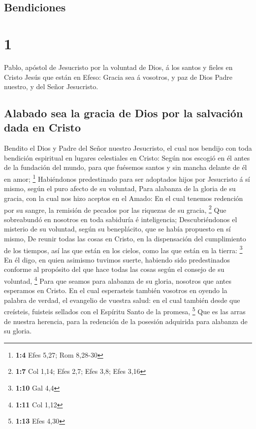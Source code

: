 \hypertarget{bendiciones}{%
\subsection{Bendiciones}\label{bendiciones}}

\hypertarget{section}{%
\section{1}\label{section}}

 Pablo, apóstol de Jesucristo por la voluntad de Dios, á
los santos y fieles en Cristo Jesús que están en Efeso: 
Gracia sea á vosotros, y paz de Dios Padre nuestro, y del Señor
Jesucristo.

\hypertarget{alabado-sea-la-gracia-de-dios-por-la-salvaciuxf3n-dada-en-cristo}{%
\subsection{Alabado sea la gracia de Dios por la salvación dada en
Cristo}\label{alabado-sea-la-gracia-de-dios-por-la-salvaciuxf3n-dada-en-cristo}}

 Bendito el Dios y Padre del Señor nuestro Jesucristo, el
cual nos bendijo con toda bendición espiritual en lugares celestiales en
Cristo:  Según nos escogió en él antes de la fundación del
mundo, para que fuésemos santos y sin mancha delante de él en amor;
\footnote{\textbf{1:4} Efes 5,27; Rom 8,28-30} 
Habiéndonos predestinado para ser adoptados hijos por Jesucristo á sí
mismo, según el puro afecto de su voluntad,  Para alabanza
de la gloria de su gracia, con la cual nos hizo aceptos en el Amado:
 En el cual tenemos redención por su sangre, la remisión
de pecados por las riquezas de su gracia, \footnote{\textbf{1:7} Col
  1,14; Efes 2,7; Efes 3,8; Efes 3,16}  Que sobreabundó en
nosotros en toda sabiduría é inteligencia; 
Descubriéndonos el misterio de su voluntad, según su beneplácito, que se
había propuesto en sí mismo,  De reunir todas las cosas
en Cristo, en la dispensación del cumplimiento de los tiempos, así las
que están en los cielos, como las que están en la tierra: \footnote{\textbf{1:10}
  Gal 4,4}  En él digo, en quien asimismo tuvimos suerte,
habiendo sido predestinados conforme al propósito del que hace todas las
cosas según el consejo de su voluntad, \footnote{\textbf{1:11} Col 1,12}
 Para que seamos para alabanza de su gloria, nosotros que
antes esperamos en Cristo.  En el cual esperasteis
también vosotros en oyendo la palabra de verdad, el evangelio de vuestra
salud: en el cual también desde que creísteis, fuisteis sellados con el
Espíritu Santo de la promesa, \footnote{\textbf{1:13} Efes 4,30}
 Que es las arras de nuestra herencia, para la redención
de la posesión adquirida para alabanza de su gloria.

